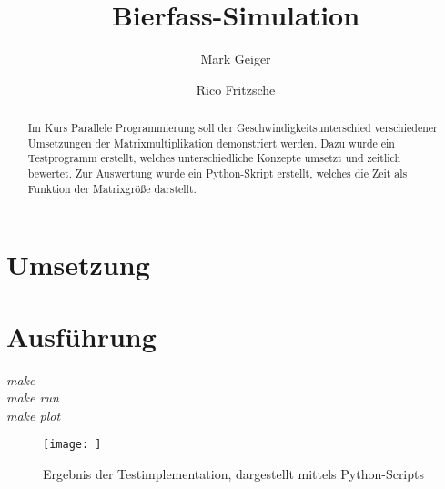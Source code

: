 \documentclass[]{article}
\title{Bierfass-Simulation}
\author{Mark Geiger \and Rico Fritzsche}
\begin{document}
\maketitle

\begin{abstract}
Im Kurs Parallele Programmierung soll der Geschwindigkeitsunterschied verschiedener Umsetzungen der Matrixmultiplikation demonstriert werden. Dazu wurde ein Testprogramm erstellt, welches unterschiedliche Konzepte umsetzt und zeitlich bewertet. Zur Auswertung wurde ein Python-Skript erstellt, welches die Zeit als Funktion der Matrixgröße darstellt.
\end{abstract}

\section*{Umsetzung}
 



\section*{Ausführung}
\textit{make}\\
\textit{make run}\\
\textit{make plot}

\begin{figure}[h]
	\centering
	\texttt{[image: ]}
	\caption{Ergebnis der Testimplementation, dargestellt mittels Python-Scripts}
	\label{pic:ergebnis}
\end{figure}
\end{document}
